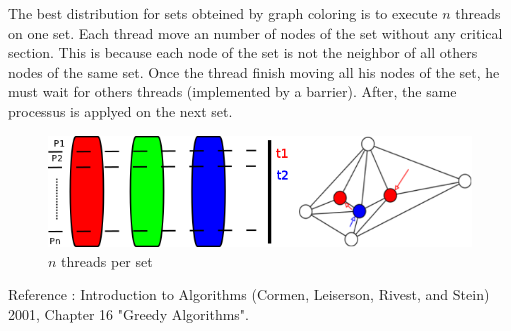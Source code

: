 The best distribution for sets obteined by graph coloring is to execute $n$ threads on one set. Each thread move an number of nodes of the set without any critical section. This is because each node of the set is not the neighbor of all others nodes of the same set. Once the thread finish moving all his nodes of the set, he must wait for others threads (implemented by a barrier). After, the same processus is applyed on the next set.

\begin{figure}[!h]
\centering
\includegraphics[scale=0.5]{img/distrib.png}
\caption{$n$ threads per set}
\end{figure}


Reference : Introduction to Algorithms (Cormen, Leiserson, Rivest, and Stein) 2001, Chapter 16 "Greedy Algorithms".